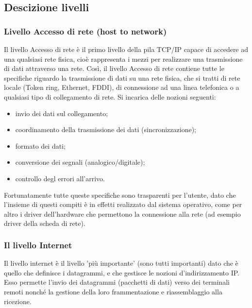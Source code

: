 \documentclass[12pt, a4paper, oneside]{book}
\begin{document}
\subsection{Descizione livelli} 
\subsubsection{Livello Accesso di rete (host to network)}
Il livello Accesso di rete è il primo livello della pila TCP/IP capace di accedere ad una qualsiasi rete fisica, cioè rappresenta i mezzi per realizzare una trasmissione di dati attraverso una rete. Così, il livello Accesso di rete contiene tutte le specifiche riguardo la trasmissione di dati su una rete fisica, che si tratti di rete locale (Token ring, Ethernet, FDDI), di connessione ad una linea telefonica o a qualsiasi tipo di collegamento di rete. Si incarica delle nozioni seguenti: 
\begin{itemize}
	\item invio dei dati sul collegamento; 
	\item coordinamento della trasmissione dei dati (sincronizzazione); 
	\item formato dei dati; 
	\item conversione dei segnali (analogico/digitale); 
	\item controllo degl errori all'arrivo.
\end{itemize}
Fortunatamente tutte queste specifiche sono trasparenti per l'utente, dato che l'insieme di questi compiti è in effetti realizzato dal sistema operativo, come per altro i driver dell'hardware che permettono la connessione alla rete (ad esempio driver della scheda di rete).
\subsubsection{Il livello Internet}
Il livello internet è il livello 'più importante' (sono tutti importanti) dato che è quello che definisce i datagrammi, e che gestisce le nozioni d'indirizzamento IP. Esso permette l'invio dei datagrammi (pacchetti di dati) verso dei terminali remoti nonché la gestione della loro frammentazione e riassemblaggio alla ricezione. 
\end{document}
